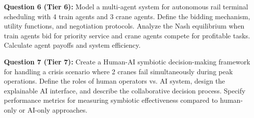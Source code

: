 \documentclass{article}
\begin{document}
\textbf{Question 6 (Tier 6):} Model a multi-agent system for autonomous rail terminal scheduling with 4 train agents and 3 crane agents. Define the bidding mechanism, utility functions, and negotiation protocols. Analyze the Nash equilibrium when train agents bid for priority service and crane agents compete for profitable tasks. Calculate agent payoffs and system efficiency.

\textbf{Question 7 (Tier 7):} Create a Human-AI symbiotic decision-making framework for handling a crisis scenario where 2 cranes fail simultaneously during peak operations. Define the roles of human operators vs. AI system, design the explainable AI interface, and describe the collaborative decision process. Specify performance metrics for measuring symbiotic effectiveness compared to human-only or AI-only approaches.
\end{document}
